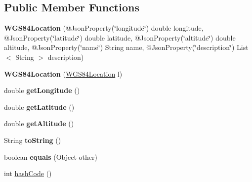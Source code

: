 \subsection*{Public Member Functions}
\begin{DoxyCompactItemize}
\item 
\mbox{\label{classeu_1_1h2020_1_1symbiote_1_1model_1_1cim_1_1WGS84Location_a63c41b34c231707e3948da73e2797641}} 
{\bfseries W\+G\+S84\+Location} (@Json\+Property(\char`\"{}longitude\char`\"{}) double longitude, @Json\+Property(\char`\"{}latitude\char`\"{}) double latitude, @Json\+Property(\char`\"{}altitude\char`\"{}) double altitude, @Json\+Property(\char`\"{}name\char`\"{}) String name, @Json\+Property(\char`\"{}description\char`\"{}) List$<$ String $>$ description)
\item 
\mbox{\label{classeu_1_1h2020_1_1symbiote_1_1model_1_1cim_1_1WGS84Location_a5364e93a05ecaf966e4140943af50f76}} 
{\bfseries W\+G\+S84\+Location} (\hyperlink{classeu_1_1h2020_1_1symbiote_1_1model_1_1cim_1_1WGS84Location}{W\+G\+S84\+Location} l)
\item 
\mbox{\label{classeu_1_1h2020_1_1symbiote_1_1model_1_1cim_1_1WGS84Location_af910e2ee3328cc0b2c0bcbbe276e8a76}} 
double {\bfseries get\+Longitude} ()
\item 
\mbox{\label{classeu_1_1h2020_1_1symbiote_1_1model_1_1cim_1_1WGS84Location_a931b1572b0dbc102b9930f2a7a1c3a3e}} 
double {\bfseries get\+Latitude} ()
\item 
\mbox{\label{classeu_1_1h2020_1_1symbiote_1_1model_1_1cim_1_1WGS84Location_a4c12abc76e8297ebda531711459c45fc}} 
double {\bfseries get\+Altitude} ()
\item 
\mbox{\label{classeu_1_1h2020_1_1symbiote_1_1model_1_1cim_1_1WGS84Location_a30aa0ff5a1627460b4215b753b8f59ce}} 
String {\bfseries to\+String} ()
\item 
\mbox{\label{classeu_1_1h2020_1_1symbiote_1_1model_1_1cim_1_1WGS84Location_a12c445c79a68d3ad4c0fe59f506cf83e}} 
boolean {\bfseries equals} (Object other)
\item 
int \hyperlink{classeu_1_1h2020_1_1symbiote_1_1model_1_1cim_1_1WGS84Location_aff77c8c18f4b41d2c3c31ce3d0b5476b}{hash\+Code} ()
\end{DoxyCompactItemize}
